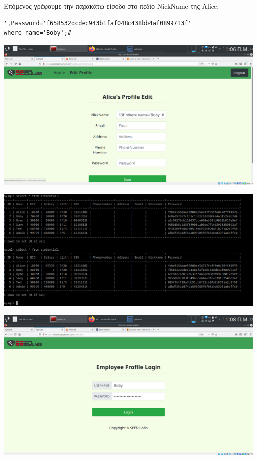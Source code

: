 \noindent
Επόμενος γράφουμε την παρακάτω είσοδο στο πεδίο NickName της Alice.

\begin{center}
	\begin{lstlisting}
',Password='f658532dcdec943b1faf048c438bb4af0899713f' 
where name='Boby';#
	\end{lstlisting}	
\end{center}

\begin{center}
			\includegraphics[width=1\textwidth]{image/3.3.0.PNG}		
\end{center}

\begin{center}
			\includegraphics[width=1\textwidth]{image/3.3.1.PNG}		
\end{center}

\begin{center}
			\includegraphics[width=1\textwidth]{image/3.3.2.PNG}		
\end{center}

